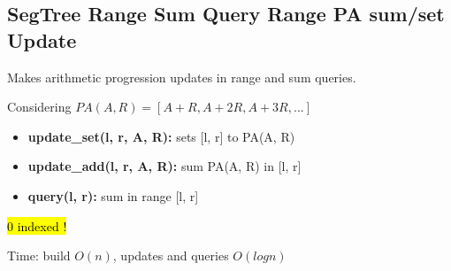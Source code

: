 \subsection{SegTree Range Sum Query Range PA sum/set Update}

Makes arithmetic progression updates in range and sum queries.

Considering $PA(A, R) = [A+R, A+2R, A+3R, ... ]$

\begin{itemize}

  \item \textbf{update\_set(l, r, A, R):} sets [l, r] to PA(A, R)
  \item \textbf{update\_add(l, r, A, R):} sum PA(A, R) in [l, r]
  \item \textbf{query(l, r):} sum in range [l, r]

\end{itemize}

\hl{0 indexed !}

Time: build $O(n)$, updates and queries $O(log{n})$

